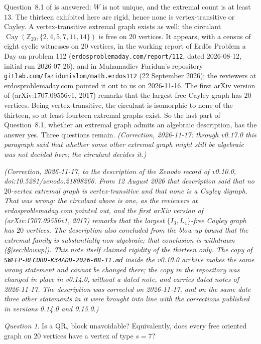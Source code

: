 \documentclass[11pt]{amsart}
\newcommand{\QR}{\mathrm{QR}_7}
\DeclareMathOperator{\Cay}{Cay}
\theoremstyle{plain}
\theoremstyle{definition}
\theoremstyle{remark}
\newtheorem{question}[theorem]{Question}
\begin{document}
Question~8.1 of \cite{PartG} is answered: $W$ is not unique, and the
extremal count is at least $13$. The thirteen exhibited here are rigid,
hence none is vertex-transitive or Cayley. A vertex-transitive extremal
graph exists as well: the circulant
$\Cay(\mathbb{Z}_{20},\{2,4,5,7,11,14\})$ is free on $20$ vertices. It
appears, with a census of eight cyclic witnesses on $20$ vertices, in the
working report of Erd\H{o}s Problem a Day on problem 112
(\texttt{erdosproblemaday.com/report/112}, dated 2026-08-12, initial run
2026-07-26), and in Muhamadiev Faridun's repository
\texttt{gitlab.com/faridunislom/math.erdos112} (22 September 2026); the
reviewers at erdosproblemaday.com pointed it out to us on 2026-11-16. The
first arXiv version of \cite{IRW21} (arXiv:1707.09556v1, 2017) remarks that the
largest free Cayley graph has $20$ vertices. Being vertex-transitive, the
circulant is isomorphic to none of the thirteen, so at least fourteen
extremal graphs exist. So the last part of Question~8.1, whether an
extremal graph admits an algebraic description, has the answer yes. Three
questions remain. \emph{(Correction, 2026-11-17: through v0.17.0 this
paragraph said that whether some other extremal graph might still be
algebraic was not decided here; the circulant decides it.)}

\emph{(Correction, 2026-11-17, to the description of the Zenodo record of
v0.10.0, doi:10.5281/zenodo.21898266. From 12 August 2026 that description
said that no $20$-vertex extremal graph is vertex-transitive and that none
is a Cayley digraph. That was wrong: the circulant above is one, as the
reviewers at erdosproblemaday.com pointed out, and the first arXiv version
of \cite{IRW21} (arXiv:1707.09556v1, 2017) remarks that the largest
$\{I_3,L_4\}$-free Cayley graph has $20$ vertices. The description also
concluded from the blow-up bound that the extremal family is substantially
non-algebraic; that conclusion is withdrawn (\S\ref{sec:blowup}). This
note itself claimed rigidity of the thirteen only. The copy of
\texttt{SWEEP-RECORD-K34ADD-2026-08-11.md} inside the v0.10.0 archive
makes the same wrong statement and cannot be changed there; the copy in
the repository was changed in place in v0.14.0, without a dated note, and
carries dated notes of 2026-11-17. The
description was corrected on 2026-11-17, and on the same date three other
statements in it were brought into line with the corrections published in
versions 0.14.0 and 0.15.0.)}

\begin{question}\label{q:forced}
Is a $\QR$ block unavoidable? Equivalently, does every free oriented
graph on $20$ vertices have a vertex of type $s=7$?
\end{question}
\end{document}
